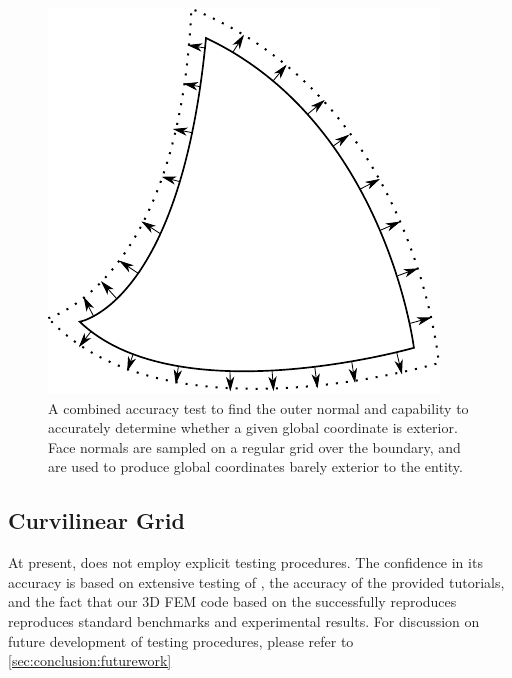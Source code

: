 \begin{figure}
    \centering
    \includegraphics[scale=1.0]{images/normaltest}
	\captionsetup{width=0.8\textwidth} 
	\caption{A combined accuracy test to find the outer normal and capability to accurately determine whether a given global coordinate is exterior. Face normals are sampled on a regular grid over the boundary, and are used to produce global coordinates barely exterior to the entity. }
	\label{fig:geometry:test:normal}
\end{figure}


\subsection{Curvilinear Grid}
\label{sec:tests:curvgrid}

At present, \curvgrid{} does not employ explicit testing procedures. The confidence in its accuracy is based on extensive testing of \curvgeom{}, the accuracy of the provided tutorials, and the fact that our 3D FEM code based on the \curvgrid{} successfully reproduces reproduces standard benchmarks and experimental results. For discussion on future development of \curvgrid{} testing procedures, please refer to \cref{sec:conclusion:futurework}

